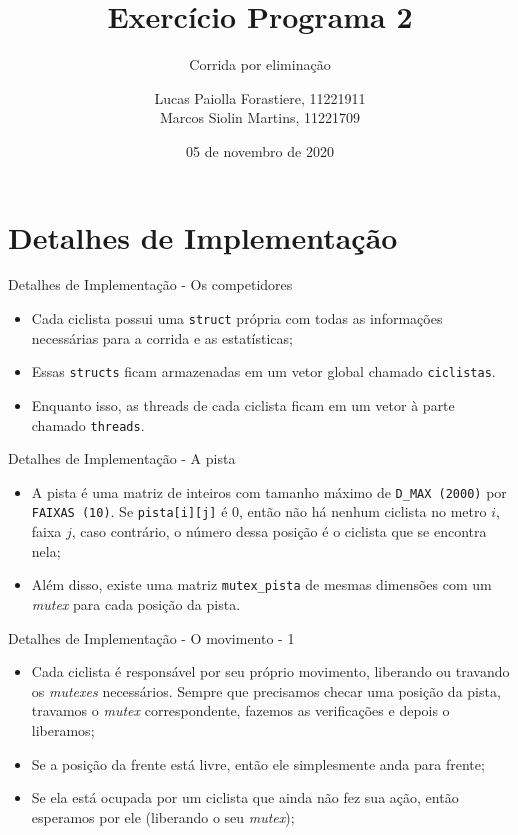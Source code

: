 \documentclass[10pt]{beamer}
\title{Exercício Programa 2}
\subtitle{Corrida por eliminação}
\institute{IME-USP}
\author{Lucas Paiolla Forastiere, 11221911\\ Marcos Siolin Martins, 11221709}
\date{05 de novembro de 2020}
\begin{document}
    \maketitle

    \section{Detalhes de Implementação}

    \begin{frame}{Detalhes de Implementação - Os competidores}
        \begin{itemize}
            \justifying
            \item Cada ciclista possui uma \texttt{struct} própria com todas
                as informações necessárias para a corrida e as estatísticas;
            \item Essas \texttt{structs} ficam armazenadas em um vetor global
                chamado \texttt{ciclistas}.
            \item Enquanto isso, as threads de cada ciclista ficam em um vetor
                à parte chamado \texttt{threads}.

        \end{itemize}
    \end{frame}

    \begin{frame}{Detalhes de Implementação - A pista}
        \begin{itemize}
            \justifying
            \item A pista é uma matriz de inteiros com tamanho máximo de
                \texttt{D\_MAX (2000)} por \texttt{FAIXAS (10)}. Se
                \texttt{pista[i][j]} é $0$, então não há nenhum ciclista no
                metro $i$, faixa $j$, caso contrário, o número dessa posição é
                o ciclista que se encontra nela;
            \item Além disso, existe uma matriz \texttt{mutex\_pista} de mesmas
              dimensões com um \textit{mutex} para cada posição da pista.
        \end{itemize}
    \end{frame}

    \begin{frame}{Detalhes de Implementação - O movimento - 1}
      \begin{itemize}
        \justifying
        \item Cada ciclista é responsável por seu próprio movimento, liberando
          ou travando os \textit{mutexes} necessários. Sempre que precisamos
          checar uma posição da pista, travamos o \textit{mutex} correspondente,
          fazemos as verificações e depois o liberamos;
          \item Se a posição da frente está livre, então ele simplesmente anda
          para frente;
        \item Se ela está ocupada por um ciclista que ainda não fez sua ação,
          então esperamos por ele (liberando o seu \textit{mutex});
      \end{itemize}
    \end{frame}
\end{document}
